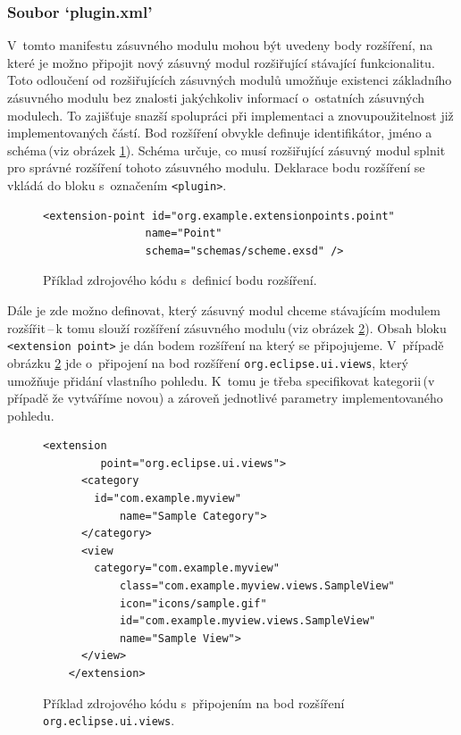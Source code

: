       \subsubsection{Soubor `plugin.xml'}
      V~tomto manifestu zásuvného modulu mohou být uvedeny body rozšíření, na které je možno připojit nový zásuvný modul rozšiřující stávající funkcionalitu. Toto odloučení od rozšiřujících zásuvných modulů umožňuje existenci základního zásuvného modulu bez znalosti jakýchkoliv informací o~ostatních zásuvných modulech. To zajišťuje snazší spolupráci při implementaci a znovupoužitelnost již implementovaných částí. Bod rozšíření obvykle definuje identifikátor, jméno a schéma\,(viz obrázek \ref{code:extension_point_declaration}). Schéma určuje, co musí rozšiřující zásuvný modul splnit pro správné rozšíření tohoto zásuvného modulu. Deklarace bodu rozšíření se vkládá do bloku s~označením \texttt{<plugin>}. 
      
      \lstset{language=xml}
      \begin{figure}[h]
	\begin{lstlisting}[frame=single]
	  <extension-point id="org.example.extensionpoints.point"
                name="Point"
                schema="schemas/scheme.exsd" />
	\end{lstlisting}
	\caption{Příklad zdrojového kódu s~definicí bodu rozšíření.}
	\label{code:extension_point_declaration}
      \end{figure}
      
      Dále je zde možno definovat, který zásuvný modul chceme stávajícím modulem rozšířit\,--\,k tomu slouží rozšíření zásuvného modulu\,(viz obrázek \ref{code:extension_declaration}). Obsah bloku \texttt{<extension point>} je dán bodem rozšíření na který se připojujeme. V~případě obrázku \ref{code:extension_declaration} jde o~připojení na bod rozšíření \texttt{org.eclipse.ui.views}, který umožňuje přidání vlastního pohledu. K~tomu je třeba specifikovat kategorii\,(v případě že vytváříme novou) a zároveň jednotlivé parametry implementovaného pohledu.
      
      \begin{figure}[h]
	\begin{lstlisting}[frame=single]
	  <extension
         point="org.eclipse.ui.views">
	  <category
	    id="com.example.myview"
            name="Sample Category">
	  </category>
	  <view
	    category="com.example.myview"
            class="com.example.myview.views.SampleView"
            icon="icons/sample.gif"
            id="com.example.myview.views.SampleView"
            name="Sample View">
	  </view>
	</extension>
	\end{lstlisting}
	\caption{Příklad zdrojového kódu s~připojením na bod rozšíření \texttt{org.eclipse.ui.views}.}
	\label{code:extension_declaration}
      \end{figure}